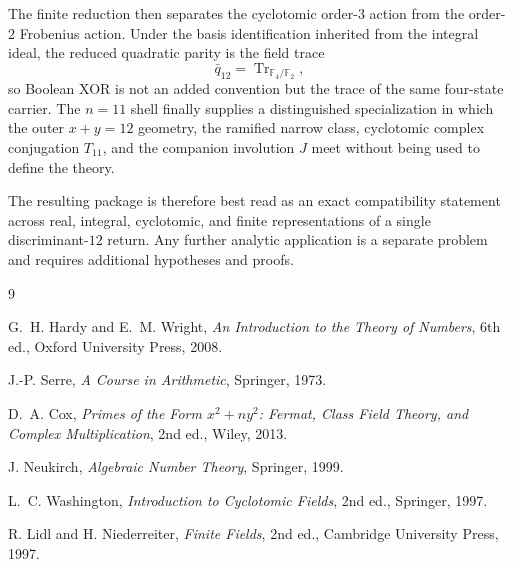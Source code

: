 \documentclass[11pt]{article}
\theoremstyle{remark}
\newcommand{\F}{\mathbb F}
\newcommand{\Tr}{\operatorname{Tr}}
\begin{document}
The finite reduction then separates the cyclotomic order-$3$ action from the
order-$2$ Frobenius action.  Under the basis identification inherited from the
integral ideal, the reduced quadratic parity is the field trace
\[
\bar q_{12}=\Tr_{\F_4/\F_2},
\]
so Boolean XOR is not an added convention but the trace of the same
four-state carrier.  The $n=11$ shell finally supplies a distinguished
specialization in which the outer $x+y=12$ geometry, the ramified narrow
class, cyclotomic complex conjugation $T_{11}$, and the companion involution
$J$ meet without being used to define the theory.

The resulting package is therefore best read as an exact compatibility
statement across real, integral, cyclotomic, and finite representations of a
single discriminant-$12$ return.  Any further analytic application is a
separate problem and requires additional hypotheses and proofs.

\begin{thebibliography}{9}

G.~H. Hardy and E.~M. Wright,
\emph{An Introduction to the Theory of Numbers},
6th ed., Oxford University Press, 2008.

J.-P. Serre,
\emph{A Course in Arithmetic},
Springer, 1973.

D.~A. Cox,
\emph{Primes of the Form $x^2+ny^2$: Fermat, Class Field Theory, and Complex Multiplication},
2nd ed., Wiley, 2013.

J. Neukirch,
\emph{Algebraic Number Theory},
Springer, 1999.

L.~C. Washington,
\emph{Introduction to Cyclotomic Fields},
2nd ed., Springer, 1997.

R. Lidl and H. Niederreiter,
\emph{Finite Fields},
2nd ed., Cambridge University Press, 1997.

\end{thebibliography}
\end{document}
